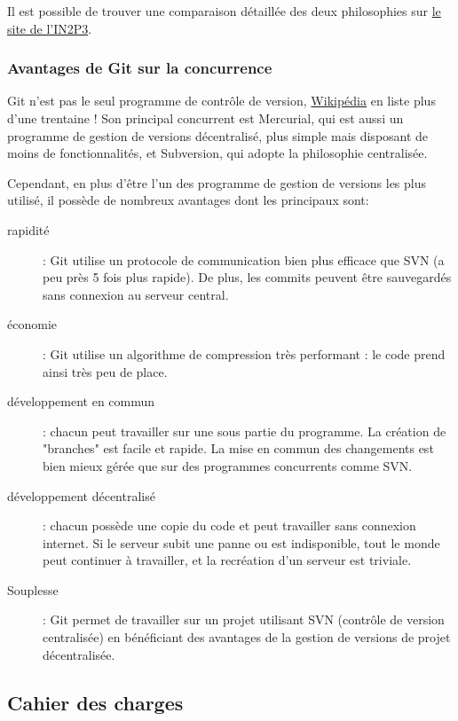 Il est possible de trouver une comparaison détaillée des deux philosophies sur
\href{http://informatique.in2p3.fr/?q=node/333}{le site de l'IN2P3}.


\subsubsection{Avantages de Git sur la concurrence}

Git n'est pas le seul programme de contrôle de version,
\href{http://en.wikipedia.org/wiki/Comparison_of_revision_control_software}{Wikipédia} en liste plus d'une trentaine !
Son principal concurrent est Mercurial, qui est aussi un programme de gestion de versions décentralisé,
plus simple mais disposant de moins de fonctionnalités, et Subversion, qui adopte la philosophie centralisée.

Cependant, en plus d'être l'un des programme de gestion de versions les plus utilisé,
 il possède de nombreux avantages dont les principaux sont:
\begin{description}
  \item[rapidité] : Git utilise un protocole de communication bien plus efficace que SVN (a peu près 5 fois plus rapide). 
  De plus, les commits peuvent être sauvegardés sans connexion au serveur central.
  \item[économie] : Git utilise un algorithme de compression très performant : le code prend ainsi très peu de place.
  \item[développement en commun] : chacun peut travailler sur une sous partie du programme. La création de "branches" est facile et
  rapide. La mise en commun des changements est bien mieux gérée que sur des programmes concurrents comme SVN.
  \item[développement décentralisé] : chacun possède une copie du code et peut travailler sans connexion internet. 
  Si le serveur subit une panne ou est indisponible, tout le monde peut continuer à travailler, et la recréation d'un serveur est triviale.
  \item[Souplesse] : Git permet de travailler sur un projet utilisant SVN (contrôle de version centralisée)
  en bénéficiant des avantages de la gestion de versions de projet décentralisée.
\end{description}

\subsection{Cahier des charges}

